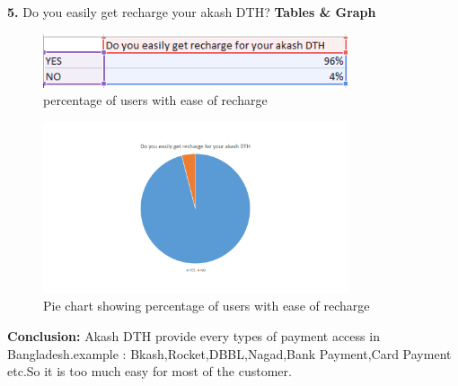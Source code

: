 \begin{spacing}{1}
{\bf 5.} Do you easily get recharge your akash DTH?\newline
{\bf Tables \& Graph}\newline
\begin{figure}[H]
	\centering
	\includegraphics[width=0.8\textwidth]{fig5_1}
	\caption{percentage of users with ease of recharge}
	\label{fig:Table4}
\end{figure}
\begin{figure}[H]
	\centering
	\includegraphics[width=0.8\textwidth]{fig5_2}
	\caption{Pie chart showing percentage of users with ease of recharge}
	\label{fig:pie3}
\end{figure}
{\bf Conclusion: }\newline
Akash DTH provide every types of payment access in Bangladesh.example : Bkash,Rocket,DBBL,Nagad,Bank Payment,Card Payment etc.So it is too much easy for most of the customer.


\end{spacing}
